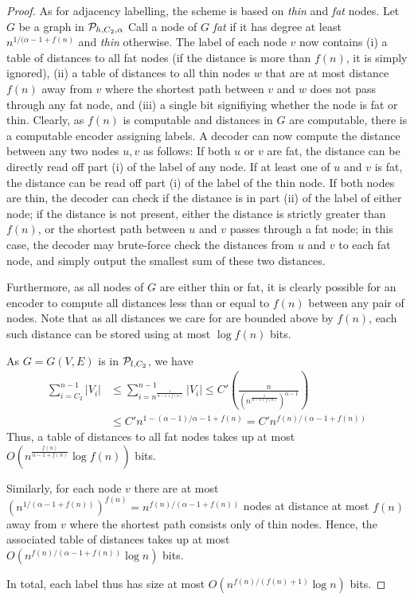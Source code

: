 \begin{proof}
As for adjacency labelling, the scheme is based on \emph{thin} and \emph{fat} nodes. Let $G$ be a graph
in $ \mathcal{P}_{h,C_2,\alpha}$ Call
a node of $G$ \emph{fat} if it has degree at least $n^{1/(\alpha - 1 + f(n)}$ and \emph{thin} otherwise.
The label of each node $v$ now contains (i) a table of distances to all fat nodes (if the distance is more than $f(n)$, it is simply ignored), (ii) a table of distances to all thin nodes $w$ that are at most distance $f(n)$ away from $v$
where the shortest path between $v$ and $w$ does not pass through any fat node, and (iii) a single bit signifiying whether the node is fat or thin.
Clearly, as $f(n)$ is computable and distances in $G$ are computable, there is a computable encoder
assigning labels. A decoder can now compute the distance between any two nodes $u,v$ as follows:
If both $u$ or $v$ are fat, the distance can be directly read off part (i) of the label of any node. If at least one of $u$ 
and $v$ is fat, the distance can be read off part (i) of the label of the thin node. If both nodes are thin, the decoder
can check if the distance is in part (ii) of the label of either node; if the distance is not present, 
either the distance is strictly greater than $f(n)$, or the shortest path between $u$ and $v$ passes through
a fat node; in this case, the decoder may brute-force check the distances from $u$ and $v$ to each fat node,
and simply output the smallest sum of these two distances.

Furthermore, as all nodes of $G$ are either thin or fat, it is clearly possible for an encoder to compute
all distances less than or equal to $f(n)$ between any pair of nodes. Note that as all distances we care for 
are bounded above by $f(n)$, each such distance can be stored using at most $\log f(n)$ bits.

As $G = G(V,E)$ is in $ \mathcal{P}_{l,C_2}$, we have 
\begin{align*}
\sum_{i = C_2}^{n-1} \vert V_i \vert
&\leq \sum_{i = n^{\frac{1}{\alpha - 1 + f(n)}}}^{n-1} \vert V_i \vert \leq C' \left( \frac{n}{\left( n^{\frac{1}{\alpha - 1 + f(n)}}\right)^{\alpha - 1}}\right)\\
&\leq C' n^{1 - (\alpha - 1)/{\alpha-1 + f(n)}} 
= C' n^{f(n)/(\alpha - 1 + f(n))}
\end{align*}
 Thus, a table of distances to all fat nodes takes up at most $O\left(n^{\frac{f(n)}{\alpha - 1 + f(n)}} \log f(n)\right)$ bits.

Similarly, for each node $v$ there are at most $\left(n^{1/(\alpha - 1 + f(n))}\right)^{f(n)} = n^{f(n)/(\alpha - 1 + f(n))}$ nodes at distance at most $f(n)$ away from $v$ where the shortest path consists only of thin nodes. Hence, the associated table of distances
takes up at most \\$O(n^{f(n)/(\alpha -1 + f(n))} \log n)$ bits.

In total, each label thus has size at most $O(n^{f(n)/(f(n)+1)} \log n)$ bits.
\end{proof}

